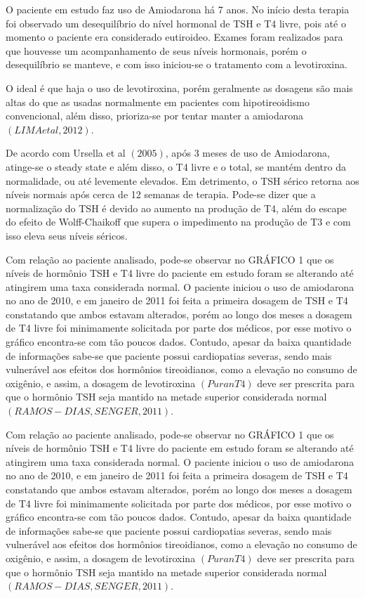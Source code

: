 \documentclass[svgnames,12pt,oneside, openright,a4paper]{scrbook}
\begin{document}
O paciente em estudo faz uso de Amiodarona há 7 anos. No início desta terapia foi observado um desequilíbrio do nível hormonal de TSH e T4 livre, pois até o momento o paciente era considerado eutiroideo. Exames foram realizados para que houvesse um acompanhamento de seus níveis hormonais, porém o desequilíbrio se manteve, e com isso iniciou-se o tratamento com a levotiroxina. 

O ideal é que haja o uso de levotiroxina, porém geralmente as dosagens são mais altas do que as usadas normalmente em pacientes com hipotireoidismo convencional, além disso, prioriza-se por tentar manter a amiodarona $(LIMA et al, 2012)$.

De acordo com Ursella et al $(2005)$, após 3 meses de uso de Amiodarona, atinge-se o steady state e além disso, o T4 livre e o total, se mantém dentro da normalidade, ou até levemente elevados. Em detrimento, o TSH sérico retorna aos níveis normais após cerca de 12 semanas de terapia. Pode-se dizer que a normalização do TSH é devido ao aumento na produção de T4, além do escape do efeito de Wolff-Chaikoff que supera o impedimento na produção de T3 e com isso eleva seus níveis séricos.

Com relação ao paciente analisado, pode-se observar no GRÁFICO 1 que os níveis de hormônio TSH e T4 livre do paciente em estudo foram se alterando até atingirem uma taxa considerada normal. O paciente iniciou o uso de amiodarona no ano de 2010, e em janeiro de 2011 foi feita a primeira dosagem de TSH e T4 constatando que ambos estavam alterados, porém ao longo dos meses a dosagem de T4 livre foi minimamente solicitada por parte dos médicos, por esse motivo o gráfico encontra-se com tão poucos dados. Contudo, apesar da baixa quantidade de informações sabe-se que paciente possui cardiopatias severas, sendo mais vulnerável aos efeitos dos hormônios tireoidianos, como a elevação no consumo de oxigênio, e assim, a dosagem de levotiroxina $(Puran T4)$ deve ser prescrita para que o hormônio TSH seja mantido na metade superior considerada normal $(RAMOS-DIAS, SENGER, 2011)$.

Com relação ao paciente analisado, pode-se observar no GRÁFICO 1 que os níveis de hormônio TSH e T4 livre do paciente em estudo foram se alterando até atingirem uma taxa considerada normal. O paciente iniciou o uso de amiodarona no ano de 2010, e em janeiro de 2011 foi feita a primeira dosagem de TSH e T4 constatando que ambos estavam alterados, porém ao longo dos meses a dosagem de T4 livre foi minimamente solicitada por parte dos médicos, por esse motivo o gráfico encontra-se com tão poucos dados. Contudo, apesar da baixa quantidade de informações sabe-se que paciente possui cardiopatias severas, sendo mais vulnerável aos efeitos dos hormônios tireoidianos, como a elevação no consumo de oxigênio, e assim, a dosagem de levotiroxina $(Puran T4)$ deve ser prescrita para que o hormônio TSH seja mantido na metade superior considerada normal $(RAMOS-DIAS, SENGER, 2011)$.
\end{document}
